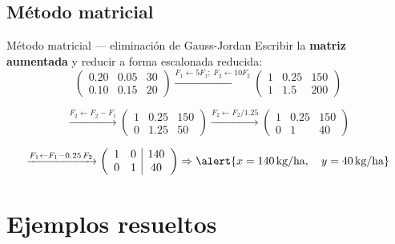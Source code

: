 \documentclass[11pt, aspectratio=169]{beamer}
\newcommand{\unidad}[1]{\,\text{#1}}
\begin{document}
\subsection{Método matricial}

\begin{frame}{Método matricial — eliminación de Gauss-Jordan}
  Escribir la \textbf{matriz aumentada} y reducir a forma escalonada reducida:
  \[
    \left(\begin{array}{cc|c}
      0.20 & 0.05 & 30 \\
      0.10 & 0.15 & 20
    \end{array}\right)
    \xrightarrow{F_1 \leftarrow 5F_1;\; F_2 \leftarrow 10F_2}
    \left(\begin{array}{cc|c}
      1 & 0.25 & 150 \\
      1 & 1.5  & 200
    \end{array}\right)
  \]

  \pause
  \[
    \xrightarrow{F_2 \leftarrow F_2 - F_1}
    \left(\begin{array}{cc|c}
      1 & 0.25 & 150 \\
      0 & 1.25 & 50
    \end{array}\right)
    \xrightarrow{F_2 \leftarrow F_2 / 1.25}
    \left(\begin{array}{cc|c}
      1 & 0.25 & 150 \\
      0 & 1    & 40
    \end{array}\right)
  \]

  \pause
  \[
    \xrightarrow{F_1 \leftarrow F_1 - 0.25\,F_2}
    \left(\begin{array}{cc|c}
      1 & 0 & 140 \\
      0 & 1 & 40
    \end{array}\right)
    \Rightarrow
    \alert{x = 140 \unidad{kg/ha}, \quad y = 40 \unidad{kg/ha}}
  \]
\end{frame}

\section{Ejemplos resueltos}
\end{document}
